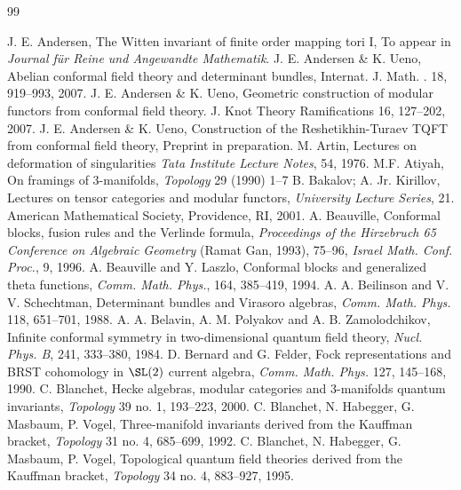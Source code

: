 \begin{thebibliography}{99}

 J. E. Andersen, The Witten invariant of finite order mapping tori I, To appear in \emph{Journal f\"ur Reine und Angewandte Mathematik}.
 J. E. Andersen \& K. Ueno, Abelian conformal field theory and determinant bundles, Internat. J. Math. . 18, 919--993, 2007.
 J. E. Andersen \& K. Ueno, Geometric construction of modular functors from conformal field theory. J. Knot Theory Ramifications 16, 127--202, 2007.
 J. E. Andersen \& K. Ueno, Construction of the Reshetikhin-Turaev TQFT from conformal field theory, Preprint in preparation.
 M. Artin, Lectures on deformation of singularities \emph{Tata Institute Lecture Notes}, 54, 1976.
 M.F. Atiyah, On framings of 3-manifolds, \emph{Topology} 29 (1990) 1--7
 B. Bakalov; A. Jr. Kirillov, Lectures on tensor categories and modular functors, \emph{University Lecture Series}, 21. American Mathematical Society, Providence, RI, 2001.
 A. Beauville, Conformal blocks, fusion rules and the Verlinde formula, \emph{Proceedings of the Hirzebruch 65 Conference on Algebraic Geometry} (Ramat Gan, 1993), 75--96, \emph{Israel Math. Conf. Proc.}, 9, 1996.
 A. Beauville and Y. Laszlo, Conformal blocks and generalized theta functions, \emph{Comm. Math. Phys.}, 164, 385--419, 1994.
 A. A. Beilinson and V. V. Schechtman, Determinant bundles and Virasoro algebras, \emph{Comm. Math. Phys.} 118, 651--701, 1988.
 A. A. Belavin, A. M. Polyakov and A. B. Zamolodchikov, Infinite conformal symmetry in two-dimensional quantum field theory, \emph{Nucl. Phys. B}, 241, 333--380, 1984.
 D. Bernard and G. Felder, Fock representations and BRST cohomology in $\SL(2)$ current algebra, \emph{Comm. Math. Phys.} 127, 145--168, 1990.
 C. Blanchet, Hecke algebras, modular categories and 3-manifolds quantum invariants, \emph{Topology} 39 no. 1, 193--223, 2000.
 C. Blanchet, N. Habegger, G. Masbaum, P. Vogel, Three-manifold invariants derived from the Kauffman bracket, \emph{Topology} 31 no. 4, 685--699, 1992.
 C. Blanchet, N. Habegger, G. Masbaum, P. Vogel, Topological quantum field theories derived from the Kauffman bracket, \emph{Topology} 34 no. 4, 883--927, 1995.

\end{thebibliography}
